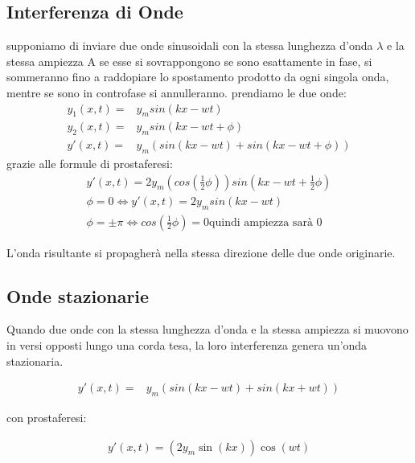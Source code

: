 \documentclass[a4paper,11pt]{article}
\begin{document}
\subsection{Interferenza di Onde}
    supponiamo di inviare due onde sinusoidali con la stessa lunghezza d'onda \(\lambda\) e la stessa ampiezza A
    se esse si sovrappongono se sono esattamente in fase, si sommeranno fino a raddopiare lo spostamento prodotto da ogni singola onda, mentre se sono in controfase si annulleranno.
    prendiamo le due onde:
    \begin{align*}
        y_1(x,t) =& y_m sin(kx - wt)
        \\
        y_2(x,t) =& y_m sin(kx - wt + \phi)
        \\
        y \prime (x,t) =&  y_m \left(sin(kx - wt) +  sin(kx - wt + \phi) \right)
    \end{align*}
grazie alle formule di prostaferesi:
\begin{align*}
    y \prime (x,t) =  2y_m \left( cos \left( \frac{1}{2}\phi \right) \right) sin \left(kx - wt + \frac{1}{2} \phi\right)
    \\
    \phi = 0 \Leftrightarrow y \prime (x,t) =  2y_m sin (kx - wt)
    \\
    \phi = \pm \pi \Leftrightarrow cos \left(\frac{1}{2}\phi \right) = 0 \text{quindi ampiezza sarà 0}
\end{align*}

L'onda risultante si propagherà nella stessa direzione delle due onde originarie. 

\subsection{Onde stazionarie}
\label{sec:OndeStazionarie}
Quando due onde con la stessa lunghezza d'onda e la stessa ampiezza si muovono in versi opposti lungo una corda tesa, la loro interferenza genera un'onda stazionaria.

\begin{align*}
    y \prime (x,t) =&  y_m \left(sin(kx - wt) +  sin(kx + wt) \right)
\end{align*}

con prostaferesi: 

\begin{align*}
    y \prime (x,t) = \left( 2y_m \sin(kx) \right) \cos(wt)
\end{align*}
\end{document}

